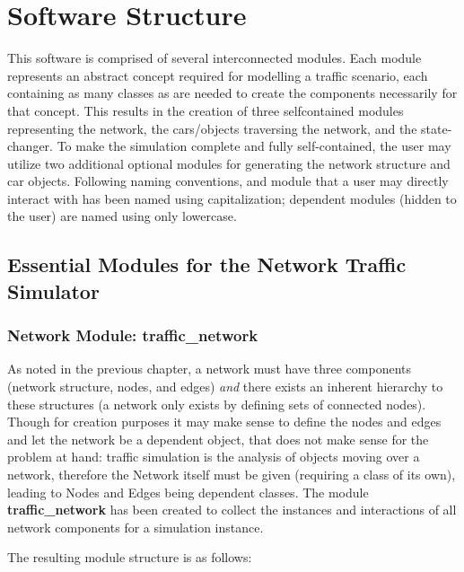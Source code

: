 \chapter{Software Structure}
\label{Structure}

\par This software is comprised of several interconnected modules.  Each module represents an abstract concept required for modelling a traffic scenario, each containing as many classes as are needed to create the components necessarily for that concept.  This results in the creation of three self\-contained modules representing the network, the cars/objects traversing the network, and the state-changer.  To make the simulation complete and fully self-contained, the user may utilize two additional optional modules for generating the network structure and car objects. Following naming conventions, and module that a user may directly interact with has been named using capitalization; dependent modules (hidden to the user) are named using only lowercase.

\section{Essential Modules for the Network Traffic \\ Simulator}

\subsection{Network Module:  traffic\_network}

\par As noted in the previous chapter, a network must have three components (network structure, nodes, and edges) \textit{and} there exists an inherent hierarchy to these structures (a network only exists by defining sets of connected nodes).  Though for creation purposes it may make sense to define the nodes and edges and let the network be a dependent object, that does not make sense for the problem at hand:  traffic simulation is the analysis of objects moving over a network, therefore the Network itself must be given (requiring a class of its own), leading to Nodes and Edges being dependent classes.  The module \textbf{traffic\_network} has been created to collect the instances and interactions of all network components for a simulation instance.  \\

\par The resulting module structure is as follows:

